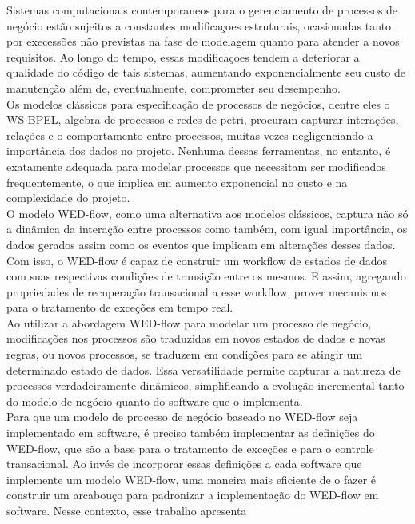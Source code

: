 \documentclass[conference]{IEEEtran}
\begin{document}
  Sistemas computacionais contemporaneos para o gerenciamento de processos de negócio estão sujeitos a constantes 
modificaçoes estruturais, ocasionadas tanto por execessões não previstas na fase de modelagem quanto para atender a novos 
requisitos. Ao longo do tempo, essas modificaçoes tendem a deteriorar a qualidade do código de tais sistemas, aumentando 
exponencialmente seu custo de manutenção além de, eventualmente, comprometer seu desempenho.
\\
\indent  Os modelos clássicos para especificação de processos de negócios, dentre eles o WS-BPEL, algebra de processos e redes
de petri, procuram capturar interações, relações e o comportamento entre processos, muitas vezes negligenciando a importância
dos dados no projeto. Nenhuma dessas ferramentas, no entanto, é exatamente adequada para modelar processos que necessitam
ser modificados frequentemente, o que implica em aumento exponencial no custo e na complexidade do projeto.
\\
\indent  O modelo WED-flow\cite{FTPM10}, como uma alternativa aos modelos clássicos, captura não só a dinâmica da interação entre processos
como também, com igual importância, os dados gerados assim como os eventos que implicam em alterações desses dados.
Com isso, o WED-flow é capaz de construir um workflow de estados de dados com suas respectivas condições de transição 
entre os mesmos. E assim, agregando propriedades de recuperação transacional a esse workflow, prover mecanismos para o 
tratamento de exceções em tempo real.
\\
\indent  Ao utilizar a abordagem WED-flow para modelar um processo de negócio, modificações nos processos são traduzidas em novos
estados de dados e novas regras, ou novos processos, se traduzem em condições para se atingir um determinado estado de 
dados. Essa versatilidade permite capturar a natureza de processos verdadeiramente dinâmicos, simplificando a evolução 
incremental tanto do modelo de negócio quanto do software que o implementa.
\\
\indent Para que um modelo de processo de negócio baseado no WED-flow seja implementado em software, é preciso também
implementar as definições do WED-flow\cite{ICWS12}, que são a base para o tratamento de exceções e para o controle transacional.  
Ao invés de incorporar essas definições a cada software que implemente um modelo WED-flow, uma maneira mais eficiente de o fazer
é construir um arcabouço para padronizar a implementação do WED-flow em software. Nesse contexto, esse trabalho apresenta
\end{document}
